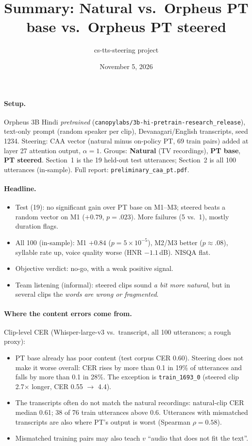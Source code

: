 \documentclass[11pt]{article}
\title{Summary: Natural vs.\ Orpheus PT base vs.\ Orpheus PT steered}
\author{cs-tts-steering project}
\date{November 5, 2026}
\begin{document}
\maketitle

\paragraph{Setup.} Orpheus 3B Hindi \emph{pretrained} (\texttt{canopylabs/3b-hi-pretrain-research\_release}), text-only prompt (random speaker per clip), Devanagari/English transcripts, seed 1234. Steering: CAA vector (natural minus on-policy PT, 69 train pairs) added at layer 27 attention output, $\alpha=1$. Groups: \textbf{Natural} (TV recordings), \textbf{PT base}, \textbf{PT steered}. Section~1 is the 19 held-out test utterances; Section~2 is all 100 utterances (in-sample). Full report: \texttt{preliminary\_caa\_pt.pdf}.

\paragraph{Headline.}
\begin{itemize}
\item Test (19): no significant gain over PT base on M1--M3; steered beats a random vector on M1 ($+0.79$, $p=.023$). More failures (5 vs.\ 1), mostly duration flags.
\item All 100 (in-sample): M1 $+0.84$ ($p=5\times10^{-5}$), M2/M3 better ($p\approx.08$), syllable rate up, voice quality worse (HNR $-1.1$\,dB). NISQA flat.
\item Objective verdict: no-go, with a weak positive signal.
\item Team listening (informal): steered clips sound \emph{a bit more natural}, but in several clips the \emph{words are wrong or fragmented}.
\end{itemize}

\paragraph{Where the content errors come from.} Clip-level CER (Whisper-large-v3 vs.\ transcript, all 100 utterances; a rough proxy):
\begin{itemize}
\item PT base already has poor content (test corpus CER 0.60). Steering does not make it worse overall: CER rises by more than 0.1 in 19\% of utterances and falls by more than 0.1 in 28\%. The exception is \texttt{train\_1693\_0} (steered clip 2.7$\times$ longer, CER 0.55 $\to$ 4.4).
\item The transcripts often do not match the natural recordings: natural-clip CER median 0.61; 38 of 76 train utterances above 0.6. Utterances with mismatched transcripts are also where PT's output is worst (Spearman $\rho=0.58$).
\item Mismatched training pairs may also teach $v$ ``audio that does not fit the text''.
\end{itemize}
\end{document}
